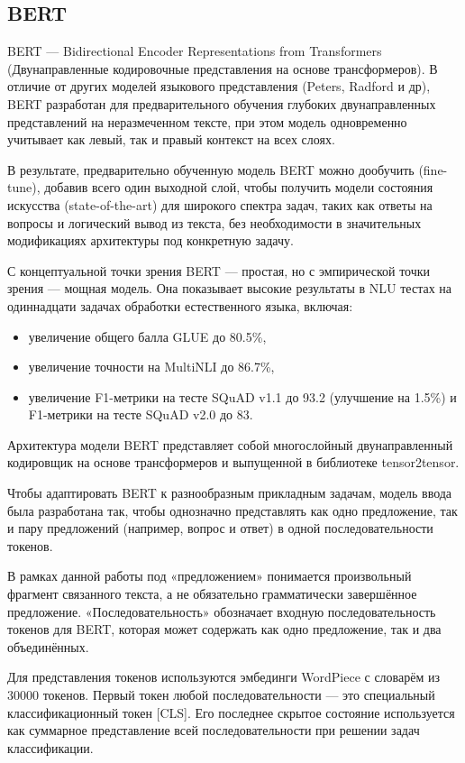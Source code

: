 \subsection{BERT}

BERT — Bidirectional Encoder Representations from Transformers (Двунаправленные кодировочные представления на основе трансформеров). В отличие от других моделей языкового представления (Peters, Radford и др), BERT разработан для предварительного обучения глубоких двунаправленных представлений на неразмеченном тексте, при этом модель одновременно учитывает как левый, так и правый контекст на всех слоях.

В результате, предварительно обученную модель BERT можно дообучить (fine-tune), добавив всего один выходной слой, чтобы получить модели состояния искусства (state-of-the-art) для широкого спектра задач, таких как ответы на вопросы и логический вывод из текста, без необходимости в значительных модификациях архитектуры под конкретную задачу.

С концептуальной точки зрения BERT — простая, но с эмпирической точки зрения — мощная модель. Она показывает высокие результаты в NLU тестах  на одиннадцати задачах обработки естественного языка, включая:
\begin{itemize}
   \item увеличение общего балла GLUE до 80.5\%,
   \item увеличение точности на MultiNLI до 86.7\%,
   \item увеличение F1-метрики на тесте SQuAD v1.1 до 93.2 (улучшение на 1.5\%) и F1-метрики на тесте SQuAD v2.0 до 83.\1%

\end{itemize}


Архитектура модели BERT представляет собой многослойный двунаправленный кодировщик на основе трансформеров и выпущенной в библиотеке tensor2tensor.

Чтобы адаптировать BERT к разнообразным прикладным задачам, модель ввода была разработана так, чтобы однозначно представлять как одно предложение, так и пару предложений (например, вопрос и ответ) в одной последовательности токенов.

В рамках данной работы под «предложением» понимается произвольный фрагмент связанного текста, а не обязательно грамматически завершённое предложение. «Последовательность» обозначает входную последовательность токенов для BERT, которая может содержать как одно предложение, так и два объединённых.

Для представления токенов используются эмбединги WordPiece  с словарём из 30000 токенов. Первый токен любой последовательности — это специальный классификационный токен [CLS]. Его последнее скрытое состояние используется как суммарное представление всей последовательности при решении задач классификации.

